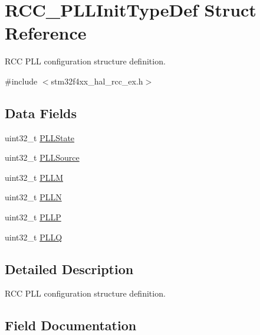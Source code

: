 \hypertarget{struct_r_c_c___p_l_l_init_type_def}{}\section{R\+C\+C\+\_\+\+P\+L\+L\+Init\+Type\+Def Struct Reference}
\label{struct_r_c_c___p_l_l_init_type_def}


R\+CC P\+LL configuration structure definition.  




{\ttfamily \#include $<$stm32f4xx\+\_\+hal\+\_\+rcc\+\_\+ex.\+h$>$}

\subsection*{Data Fields}
\begin{DoxyCompactItemize}
\item 
uint32\+\_\+t \mbox{\hyperlink{struct_r_c_c___p_l_l_init_type_def_ab3bb33f461bb409576e1c899c962e0b0}{P\+L\+L\+State}}
\item 
uint32\+\_\+t \mbox{\hyperlink{struct_r_c_c___p_l_l_init_type_def_a418ecda4a355c6a161e4893a7bc1897f}{P\+L\+L\+Source}}
\item 
uint32\+\_\+t \mbox{\hyperlink{struct_r_c_c___p_l_l_init_type_def_adb1ffaed93a1680042e24b5442b90af4}{P\+L\+LM}}
\item 
uint32\+\_\+t \mbox{\hyperlink{struct_r_c_c___p_l_l_init_type_def_a2e8a73f7961f8d6570193c68daba88a6}{P\+L\+LN}}
\item 
uint32\+\_\+t \mbox{\hyperlink{struct_r_c_c___p_l_l_init_type_def_ae2047a6040de6fcd43e0033a7b09a226}{P\+L\+LP}}
\item 
uint32\+\_\+t \mbox{\hyperlink{struct_r_c_c___p_l_l_init_type_def_a4f9e0db99adb7afb9d2a87a2b4f433ab}{P\+L\+LQ}}
\end{DoxyCompactItemize}


\subsection{Detailed Description}
R\+CC P\+LL configuration structure definition. 

\subsection{Field Documentation}
\mbox{\label{struct_r_c_c___p_l_l_init_type_def_adb1ffaed93a1680042e24b5442b90af4}} 
